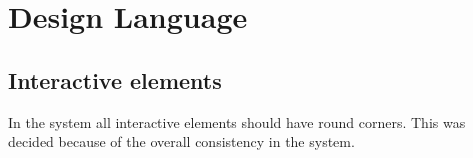 \section{Design Language}
\label{design:design_language}

\subsection{Interactive elements}
\label{design:button_design}

In the \giraf[] system all interactive elements should have round corners. This was decided because of the overall consistency in the \giraf[] system.

